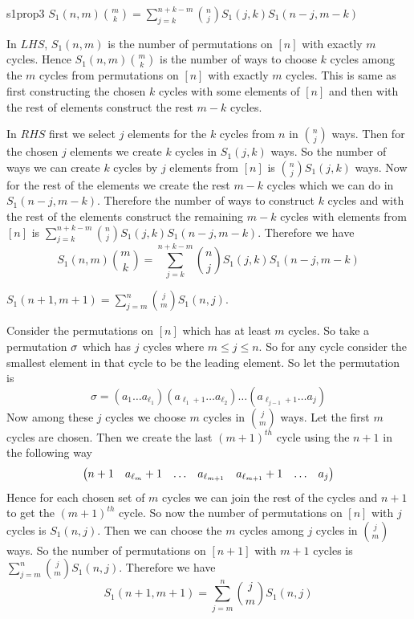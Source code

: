 \begin{lemma}{}{s1prop3}
	$S_1(n,m)\displaystyle\binom{m}{k}=\sum_{j=k}^{n+k-m}\binom{n}{j}S_1(j,k)S_1(n-j,m-k)$
\end{lemma}
\begin{combi-proof}
	In $LHS$, $S_1(n,m)$ is the number of permutations on $[n]$ with exactly $m$ cycles. Hence $S_1(n,m)\binom{m}{k}$ is the number of ways to choose $k$ cycles among the $m$ cycles from permutations on $[n]$ with exactly $m$ cycles. This is same as first constructing the chosen $k$ cycles with some elements of $[n]$ and then with the rest of elements construct the rest $m-k$ cycles.
	
	In $RHS$ first we select  $j$ elements for the $k$ cycles from $n$ in $\binom{n}{j}$ ways. Then for the chosen $j$ elements we create $k$ cycles in $S_1(j,k)$ ways. So the number of ways we can create $k$ cycles by $j$ elements from $[n]$ is $\binom{n}{j}S_1(j,k)$ ways. Now for the rest of the elements we create the rest $m-k$ cycles which we can do in $S_1(n-j,m-k)$. Therefore the number of ways to construct $k$ cycles and with the rest of the elements construct the remaining $m-k$ cycles with elements from $[n]$ is $\sum\limits_{j=k}^{n+k-m}\binom{n}{j}S_1(j,k)S_1(n-j,m-k)$. Therefore we have $$S_1(n,m)\displaystyle\binom{m}{k}=\sum_{j=k}^{n+k-m}\binom{n}{j}S_1(j,k)S_1(n-j,m-k)$$
\end{combi-proof}
\begin{Theorem}{}{}
	$S_1(n+1,m+1)=\displaystyle\sum_{j=m}^n\binom{j}{m}S_1(n,j)$.
\end{Theorem}
\begin{combi-proof}
Consider the permutations on $[n]$ which has at least $m$ cycles. So take a permutation $\sigma$ which has $j$ cycles where $m\leq j\leq n$. So for any cycle consider the smallest element in that cycle to be the leading element. So let the permutation is $$\sigma=(a_1\ldots a_{\ell_1})(a_{\ell_1+1}\ldots a_{\ell_2})\ldots(a_{\ell_{j-1}+1}\ldots a_j)$$Now among these $j$ cycles we choose $m$ cycles in $\binom{j}{m}$ ways. Let the first $m$ cycles are chosen. Then we create the last $(m+1)^{th}$ cycle using the $n+1$ in the following way $$\left(\begin{matrix}n+1 & a_{\ell_{m}}+1& \dots& a_{\ell_{m+1}}&a_{\ell_{m+1}}+1&\dots&a_j\end{matrix}\right)$$Hence for each chosen set of $m$ cycles we can join the rest of the cycles and $n+1$ to get the $(m+1)^{th}$ cycle. So now the number of permutations on $[n]$ with $j$ cycles is $S_1(n,j)$. Then we can choose the $m$ cycles among $j$ cycles in $\binom{j}{m}$ ways. So the number of permutations on $[n+1]$ with $m+1$ cycles is $\sum\limits_{j=m}^n\binom{j}{m}S_1(n,j)$. Therefore we have $$S_1(n+1,m+1)=\displaystyle\sum_{j=m}^n\binom{j}{m}S_1(n,j)$$
\end{combi-proof}
